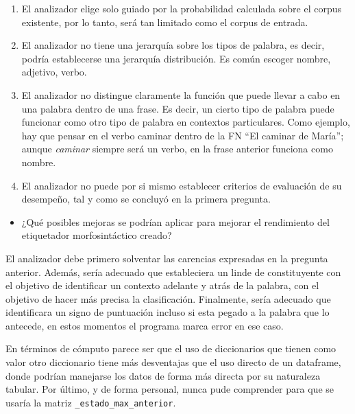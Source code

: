 \documentclass[12pt,a4paper,table]{article}
\providecommand{\tightlist}{%
      \setlength{\itemsep}{0pt}\setlength{\parskip}{0pt}}
\begin{document}
\begin{enumerate}
\def\labelenumi{\arabic{enumi}.}
\tightlist
\item
  El analizador elige solo guiado por la probabilidad calculada sobre el
  corpus existente, por lo tanto, será tan limitado como el corpus de
  entrada.
\item
  El analizador no tiene una jerarquía sobre los tipos de palabra, es
  decir, podría establecerse una jerarquía distribución. Es común
  escoger nombre, adjetivo, verbo.
\item
  El analizador no distingue claramente la función que puede llevar a
  cabo en una palabra dentro de una frase. Es decir, un cierto tipo de
  palabra puede funcionar como otro tipo de palabra en contextos
  particulares. Como ejemplo, hay que pensar en el verbo caminar dentro
  de la FN ``El caminar de María''; aunque \emph{caminar} siempre será
  un verbo, en la frase anterior funciona como nombre.
\item
  El analizador no puede por si mismo establecer criterios de evaluación
  de su desempeño, tal y como se concluyó en la primera pregunta.
\end{enumerate}

    \begin{itemize}
\tightlist
\item
  ¿Qué posibles mejoras se podrían aplicar para mejorar el rendimiento
  del etiquetador morfosintáctico creado?
\end{itemize}

    El analizador debe primero solventar las carencias expresadas en la
pregunta anterior. Además, sería adecuado que estableciera un linde de
constituyente con el objetivo de identificar un contexto adelante y
atrás de la palabra, con el objetivo de hacer más precisa la
clasificación. Finalmente, sería adecuado que identificara un signo de
puntuación incluso si esta pegado a la palabra que lo antecede, en estos
momentos el programa marca error en ese caso.

En términos de cómputo parece ser que el uso de diccionarios que tienen
como valor otro diccionario tiene más desventajas que el uso directo de
un dataframe, donde podrían manejarse los datos de forma más directa por
su naturaleza tabular. Por último, y de forma personal, nunca pude
comprender para que se usaría la matriz
\texttt{\_estado\_max\_anterior}.


    \nocite{*}
    
        
     
    
    
\end{document}
